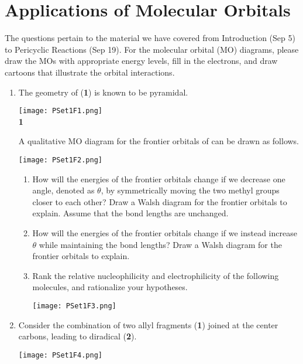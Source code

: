 \documentclass[../psets.tex]{subfiles}
\begin{document}
\section{Applications of Molecular Orbitals}
The questions pertain to the material we have covered from Introduction (Sep 5) to Pericyclic Reactions (Sep 19). For the molecular orbital (MO) diagrams, please draw the MOs with appropriate energy levels, fill in the electrons, and draw cartoons that illustrate the orbital
interactions.
\begin{enumerate}
    \item The geometry of  (\textbf{1}) is known to be pyramidal.
    \begin{center}
        \texttt{[image: PSet1F1.png]}\\
        \textbf{1}
    \end{center}
    A qualitative MO diagram for the frontier orbitals of  can be drawn as follows.
    \begin{center}
        \texttt{[image: PSet1F2.png]}
    \end{center}
    \begin{enumerate}
        \item How will the energies of the frontier orbitals change if we decrease one  angle, denoted as $\theta$, by symmetrically moving the two methyl groups closer to each other? Draw a Walsh diagram for the frontier orbitals to explain. Assume that the bond lengths are unchanged.
        \item How will the energies of the frontier orbitals change if we instead increase $\theta$ while maintaining the bond lengths? Draw a Walsh diagram for the frontier orbitals to explain.
        \item Rank the relative nucleophilicity and electrophilicity of the following molecules, and rationalize your hypotheses.
        \begin{center}
            \texttt{[image: PSet1F3.png]}
        \end{center}
    \end{enumerate}
    \item Consider the combination of two allyl fragments (\textbf{1}) joined at the center carbons, leading to diradical (\textbf{2}).
    \begin{center}
        \texttt{[image: PSet1F4.png]}
    \end{center}
    \begin{enumerate}

\end{enumerate}
\end{enumerate}
\end{document}
